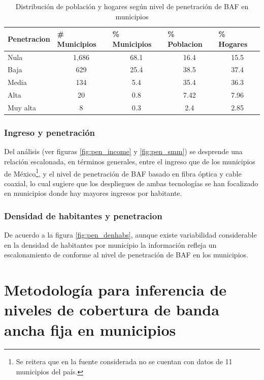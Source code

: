\documentclass[9pt,twocolumn,twoside]{ilcss}
\begin{document}
\begin{table}[tbhp]
\centering
\caption{Distribución de población y hogares según nivel de penetración de BAF en municipios}
\label{tab:dist_pob_hogs}
\begin{tabular}{@{}lcccc@{}}
	\toprule
	Penetracion & \multicolumn{1}{l}{\# Municipios} & \multicolumn{1}{l}{\% Municipios} & \multicolumn{1}{l}{\% Poblacion} & \multicolumn{1}{l}{\% Hogares} \\ \midrule
	Nula & 1,686 & 68.1 & 16.4 & 15.5 \\
	Baja & 629 & 25.4 & 38.5 & 37.4 \\
	Media & 134 & 5.4 & 35.4 & 36.3 \\
	Alta & 20 & 0.8 & 7.42 & 7.96 \\
	Muy alta & 8 & 0.3 & 2.4 & 2.85 \\ \bottomrule
\end{tabular}
\end{table}


\subsubsection{Ingreso y penetración}
Del análisis (ver figuras \ref{fig:pen_income} y \ref{fig:pen_smm}) se desprende una relación escalonada, en términos generales, entre el ingreso que de los municipios de México\footnote{Se reitera que en la fuente considerada no se cuentan con datos de 11 municipios del país.}, y el nivel de penetración de BAF basado en fibra óptica y cable coaxial, lo cual sugiere que los despliegues de ambas tecnologías se han focalizado en municipios donde hay mayores ingresos por habitante.



\subsubsection{Densidad de habitantes y penetracion}

De acuerdo a la figura \ref{fig:pen_denhabs}, aunque existe variabilidad considerable en la densidad de habitantes por municipio la información refleja un escalonamiento de conforme al nivel de penetración de BAF en los municipios.



\section{Metodología para inferencia de niveles de cobertura de banda ancha fija en municipios}
\end{document}
